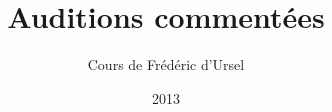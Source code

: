 \begin{titlepage}
\title{Auditions commentées}
\author{Cours de Frédéric d'Ursel}
\date{2013}
\publishers{Rapport de fin d'année \\ Philippe Massart}
\maketitle
\end{titlepage}

%

\cleardoublepage
{}
\clearscrheadfoot


\cleardoublepage

\clearscrheadfoot
\clearscrheadfoot
\renewcommand{\headfont}{\normalfont\rmfamily\scshape}
\setheadsepline[17cm]{0.4pt}
\setfootsepline[17cm]{0.4pt}
\cfoot{-- \pagemark{} --}

